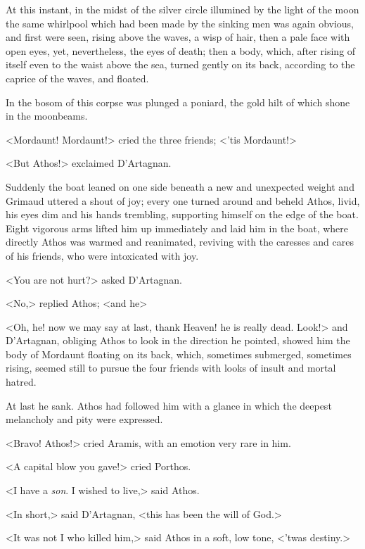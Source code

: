 At this instant, in the midst of the silver circle illumined by the light of the moon the same whirlpool which had been made by the sinking men was again obvious, and first were seen, rising above the waves, a wisp of hair, then a pale face with open eyes, yet, nevertheless, the eyes of death; then a body, which, after rising of itself even to the waist above the sea, turned gently on its back, according to the caprice of the waves, and floated.

In the bosom of this corpse was plunged a poniard, the gold hilt of which shone in the moonbeams.

<Mordaunt! Mordaunt!> cried the three friends; <'tis Mordaunt!>

<But Athos!> exclaimed D'Artagnan.

Suddenly the boat leaned on one side beneath a new and unexpected weight and Grimaud uttered a shout of joy; every one turned around and beheld Athos, livid, his eyes dim and his hands trembling, supporting himself on the edge of the boat. Eight vigorous arms lifted him up immediately and laid him in the boat, where directly Athos was warmed and reanimated, reviving with the caresses and cares of his friends, who were intoxicated with joy.

<You are not hurt?> asked D'Artagnan.

<No,> replied Athos; <and he\longdash>

<Oh, he! now we may say at last, thank Heaven! he is really dead. Look!> and D'Artagnan, obliging Athos to look in the direction he pointed, showed him the body of Mordaunt floating on its back, which, sometimes submerged, sometimes rising, seemed still to pursue the four friends with looks of insult and mortal hatred.

At last he sank. Athos had followed him with a glance in which the deepest melancholy and pity were expressed.

<Bravo! Athos!> cried Aramis, with an emotion very rare in him.

<A capital blow you gave!> cried Porthos.

<I have a \emph{son}. I wished to live,> said Athos.

<In short,> said D'Artagnan, <this has been the will of God.>

<It was not I who killed him,> said Athos in a soft, low tone, <'twas destiny.> 